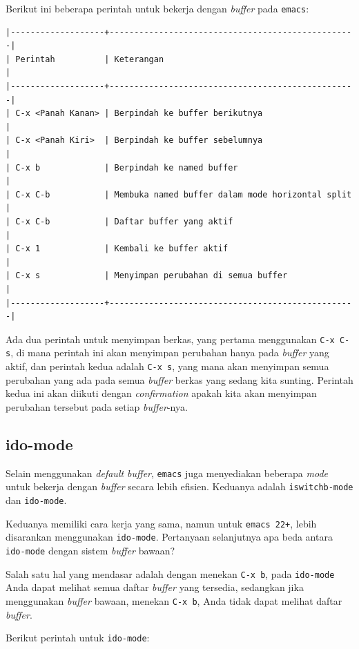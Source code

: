 \documentclass{article}
\begin{document}
Berikut ini beberapa perintah untuk bekerja dengan \emph{buffer} pada 
\verb=emacs=:

\begin{verbatim}
|-------------------+--------------------------------------------------|
| Perintah          | Keterangan                                       |
|-------------------+--------------------------------------------------|
| C-x <Panah Kanan> | Berpindah ke buffer berikutnya                   |
| C-x <Panah Kiri>  | Berpindah ke buffer sebelumnya                   |
| C-x b             | Berpindah ke named buffer                        |
| C-x C-b           | Membuka named buffer dalam mode horizontal split |
| C-x C-b           | Daftar buffer yang aktif                         |
| C-x 1             | Kembali ke buffer aktif                          |
| C-x s             | Menyimpan perubahan di semua buffer              |
|-------------------+--------------------------------------------------|
\end{verbatim}

Ada dua perintah untuk menyimpan berkas, yang pertama menggunakan
\verb=C-x C-s=, di mana perintah ini akan menyimpan perubahan hanya pada 
\emph{buffer} yang aktif, dan perintah kedua adalah \verb=C-x s=, yang mana 
akan menyimpan semua perubahan yang ada pada semua \emph{buffer} berkas
yang sedang kita sunting. Perintah kedua ini akan diikuti dengan
\emph{confirmation} apakah kita akan menyimpan perubahan tersebut pada setiap 
\emph{buffer}-nya.

\subsection{ido-mode}
Selain menggunakan \emph{default buffer}, \verb=emacs= juga menyediakan beberapa
\emph{mode} untuk bekerja dengan \emph{buffer} secara lebih efisien. Keduanya 
adalah \verb=iswitchb-mode= dan \verb=ido-mode=.

Keduanya memiliki cara kerja yang sama, namun untuk \verb=emacs 22+=, lebih 
disarankan menggunakan \verb=ido-mode=. Pertanyaan selanjutnya apa beda 
antara \verb=ido-mode= dengan sistem \emph{buffer} bawaan?

Salah satu hal yang mendasar adalah dengan menekan \verb=C-x b=, pada 
\verb=ido-mode= Anda dapat melihat semua daftar \emph{buffer} yang tersedia,
sedangkan jika menggunakan \emph{buffer} bawaan, menekan \verb=C-x b=, Anda 
tidak dapat melihat daftar \emph{buffer}.

Berikut perintah untuk \verb=ido-mode=:
\end{document}
